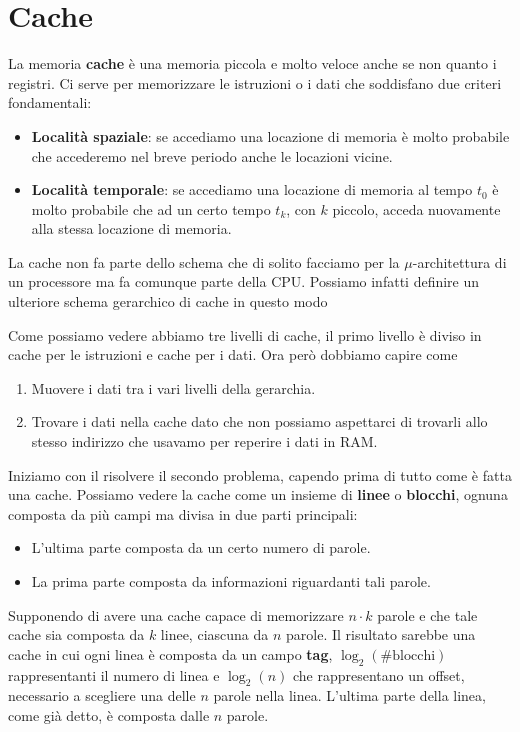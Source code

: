 \section{Cache}
La memoria \textbf{cache} è una memoria piccola e molto veloce anche se non quanto i registri.
Ci serve per memorizzare le istruzioni o i dati che soddisfano due criteri fondamentali:
\begin{itemize}
	\item \textbf{Località spaziale}: se accediamo una locazione di memoria è molto probabile che
	      accederemo nel breve periodo anche le locazioni vicine.
	\item \textbf{Località temporale}: se accediamo una locazione di memoria al tempo $t_0$ è molto
	      probabile che ad un certo tempo $t_k$, con $k$ piccolo, acceda nuovamente alla stessa
	      locazione di memoria.
\end{itemize}
La cache non fa parte dello schema che di solito facciamo per la $\mu$-architettura di un
processore ma fa comunque parte della CPU. Possiamo infatti definire un ulteriore schema gerarchico
di cache in questo modo
\begin{center}
	
\end{center}
Come possiamo vedere abbiamo tre livelli di cache, il primo livello è diviso in cache per le
istruzioni e cache per i dati. Ora però dobbiamo capire come
\begin{enumerate}
	\item Muovere i dati tra i vari livelli della gerarchia.
	\item Trovare i dati nella cache dato che non possiamo aspettarci di trovarli allo stesso
	      indirizzo che usavamo per reperire i dati in RAM.
\end{enumerate}
Iniziamo con il risolvere il secondo problema, capendo prima di tutto come è fatta una cache.
Possiamo vedere la cache come un insieme di \textbf{linee} o \textbf{blocchi}, ognuna composta da
più campi ma divisa in due parti principali:
\begin{itemize}
	\item L'ultima parte composta da un certo numero di parole.
	\item La prima parte composta da informazioni riguardanti tali parole.
\end{itemize}
Supponendo di avere una cache capace di memorizzare $n \cdot k$ parole e che tale cache sia
composta da $k$ linee, ciascuna da $n$ parole. Il risultato sarebbe una cache in cui ogni linea è
composta da un campo \textbf{tag}, $\log_2 (\# \text{blocchi})$ rappresentanti il numero di linea
e $\log_2 (n)$ che rappresentano un offset, necessario a scegliere una delle $n$ parole nella linea.
L'ultima parte della linea, come già detto, è composta dalle $n$ parole.
